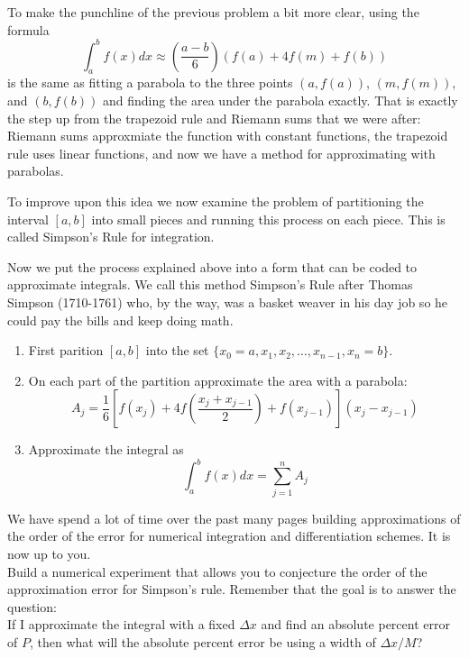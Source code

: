 To make the punchline of the previous problem a bit more clear, using the formula 
\[ \int_a^b f(x) dx \approx \left( \frac{a-b}{6} \right) \left( f(a) + 4 f(m) + f(b)
\right) \]
is the same as fitting a parabola to the three points $(a,f(a))$, $(m,f(m))$, and
$(b,f(b))$ and finding the area under the parabola exactly.  That is exactly the step up
from the trapezoid rule and Riemann sums that we were after: Riemann sums approxmiate the
function with constant functions, the trapezoid rule uses linear functions, and now we
have a method for approximating with parabolas.  

To improve upon this idea we now examine the problem of partitioning the interval $[a,b]$
into small pieces and running this process on each piece.  This is called Simpson's Rule
for integration.

\begin{technique}
    Now we put the process explained above into a form that can be coded to approximate
    integrals. We call this method Simpson's Rule after Thomas Simpson (1710-1761) who, by
    the way, was a basket weaver in his day job so he could pay the bills and keep doing
    math.
    \begin{enumerate}
        \item First parition $[a,b]$ into the set $\{x_0=a, x_1, x_2, \ldots, x_{n-1},
        x_n=b\}$.
        \item On each part of the partition approximate the area with a parabola:
            \[ A_j = \frac{1}{6} \left[ f(x_j) + 4 f\left( \frac{x_j+x_{j-1}}{2} \right) +
                f(x_{j-1}) \right]\left( x_j - x_{j-1} \right) \]
        \item Approximate the integral as
            \[ \int_a^b f(x) dx = \sum_{j=1}^n A_j \]
    \end{enumerate}
\end{technique}

\begin{problem}
    We have spend a lot of time over the past many pages building approximations of the
    order of the error for numerical integration and differentiation schemes.  It is now
    up to you.  \\
    Build a numerical experiment that allows you to conjecture the order of the
    approximation error for Simpson's rule.  Remember that the goal is to answer the
    question: \\
    If I approximate the integral with a fixed $\Delta x$ and find an absolute percent
    error of $P$, then what will the absolute percent error be using a width of $\Delta x
    / M$?
\end{problem}

